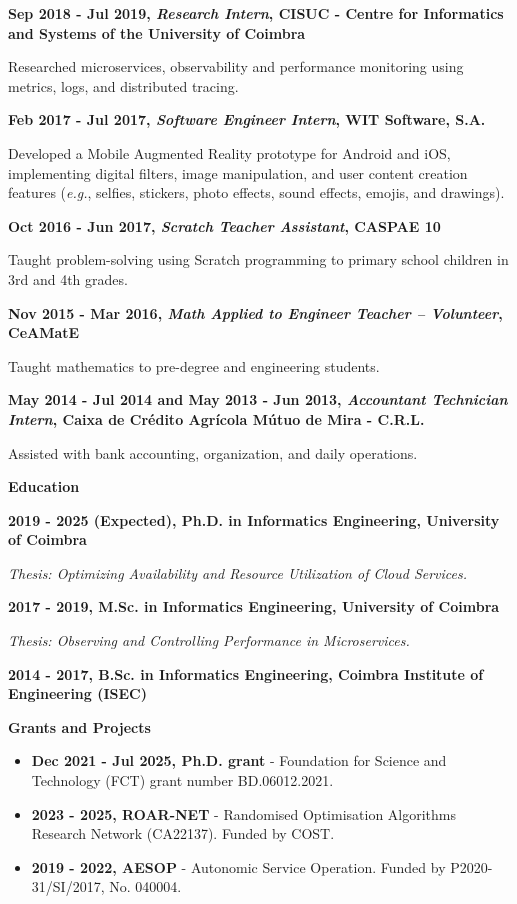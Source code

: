 \documentclass[a4paper,9pt]{memoir}
\newcommand{\Sep}{\vspace{1em}} %
\newcommand{\SmallSep}{\vspace{0.5em}} %
\newcommand{\CVSection}[1]{ %
    {\Large\textbf{#1}}\par
    \SmallSep %
}
\newcommand{\CVItem}[2]{ %
    \textbf{\color{RoyalBlue} #1}\par
    #2
    \SmallSep %
}
\begin{document}
\CVItem{Sep 2018 - Jul 2019, \textit{Research Intern}, CISUC - Centre for Informatics and Systems of the University of Coimbra}{
    Researched microservices, observability and performance monitoring using metrics, logs, and distributed tracing.
}

\CVItem{Feb 2017 - Jul 2017, \textit{Software Engineer Intern}, WIT Software, S.A.}{
    Developed a Mobile Augmented Reality prototype for Android and iOS, implementing digital filters, image manipulation, and user content creation features (\textit{e.g.}, selfies, stickers, photo effects, sound effects, emojis, and drawings).

}

\CVItem{Oct 2016 - Jun 2017, \textit{Scratch Teacher Assistant}, CASPAE 10}{
    Taught problem-solving using Scratch programming to primary school children in 3rd and 4th grades.
}

\CVItem{Nov 2015 - Mar 2016, \textit{Math Applied to Engineer Teacher -- Volunteer}, CeAMatE}{
    Taught mathematics to pre-degree and engineering students.
}

\CVItem{May 2014 - Jul 2014 and May 2013 - Jun 2013, \textit{Accountant Technician Intern}, Caixa de Crédito Agrícola Mútuo de Mira - C.R.L.}{
    Assisted with bank accounting, organization, and daily operations.
}

\Sep

\CVSection{Education}

\CVItem{2019 - 2025 (Expected), Ph.D. in Informatics Engineering, University of Coimbra}{
\emph{Thesis: Optimizing Availability and Resource Utilization of Cloud Services.}
}

\CVItem{2017 - 2019, M.Sc. in Informatics Engineering, University of Coimbra}{\emph{Thesis: Observing and Controlling Performance in Microservices.}}

\CVItem{2014 - 2017, B.Sc. in Informatics Engineering, Coimbra Institute of Engineering (ISEC)}

\Sep

\CVSection{Grants and Projects}

\begin{itemize}[leftmargin=*]
    \item \textbf{Dec 2021 - Jul 2025, Ph.D. grant} - Foundation for Science and Technology (FCT) grant number BD.06012.2021.
    \item \textbf{2023 - 2025, ROAR-NET} - Randomised Optimisation Algorithms Research Network (CA22137). Funded by COST.
    \item \textbf{2019 - 2022, AESOP} - Autonomic Service Operation. Funded by P2020-31/SI/2017, No. 040004.
\end{itemize}
\end{document}
